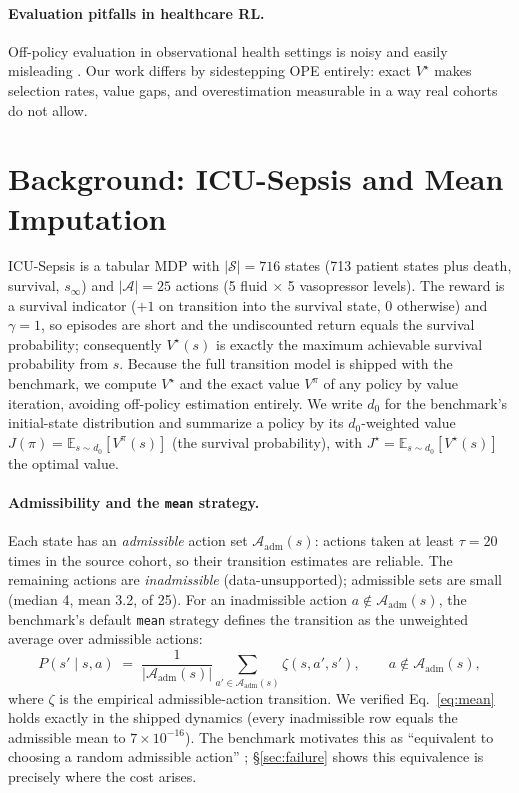 \documentclass{article}
\newcommand{\Adm}{\mathcal{A}_{\mathrm{adm}}}
\begin{document}
\paragraph{Evaluation pitfalls in healthcare RL.}
Off-policy evaluation in observational health settings is noisy and easily
misleading \citep{gottesman2019guidelines,gottesman2018evaluating}. Our work
differs by sidestepping OPE entirely: exact $V^\star$ makes selection rates,
value gaps, and overestimation measurable in a way real cohorts do not allow.

\section{Background: ICU-Sepsis and Mean Imputation}
\label{sec:background}
ICU-Sepsis \citep{choudhary2024icusepsis} is a tabular MDP with $|\mathcal{S}|{=}716$
states (713 patient states plus death, survival, $s_\infty$) and $|\mathcal{A}|{=}25$
actions (5 fluid $\times$ 5 vasopressor levels). The reward is a survival indicator
(${+}1$ on transition into the survival state, $0$ otherwise) and $\gamma{=}1$, so
episodes are short and the undiscounted return equals the survival probability;
consequently $V^\star(s)$ is exactly the maximum achievable survival probability
from $s$. Because the full transition model is shipped with the benchmark, we
compute $V^\star$ and the exact value $V^\pi$ of any policy by value iteration,
avoiding off-policy estimation entirely. We write $d_0$ for the benchmark's
initial-state distribution and summarize a policy by its $d_0$-weighted value
$J(\pi)=\mathbb{E}_{s\sim d_0}[V^\pi(s)]$ (the survival probability), with
$J^\star=\mathbb{E}_{s\sim d_0}[V^\star(s)]$ the optimal value.

\paragraph{Admissibility and the \texttt{mean} strategy.}
Each state has an \emph{admissible} action set $\Adm(s)$: actions taken at least
$\tau{=}20$ times in the source cohort, so their transition estimates are reliable.
The remaining actions are \emph{inadmissible} (data-unsupported); admissible sets
are small (median 4, mean 3.2, of 25). For an inadmissible action $a\notin\Adm(s)$,
the benchmark's default \texttt{mean} strategy defines the transition as the
unweighted average over admissible actions:
\begin{equation}
\label{eq:mean}
P(s'\mid s,a) \;=\; \frac{1}{|\Adm(s)|}\sum_{a'\in\Adm(s)} \zeta(s,a',s'),
\qquad a\notin\Adm(s),
\end{equation}
where $\zeta$ is the empirical admissible-action transition. We verified
Eq.~\eqref{eq:mean} holds exactly in the shipped dynamics (every inadmissible row
equals the admissible mean to $7\times10^{-16}$). The benchmark motivates this as
``equivalent to choosing a random admissible action'' \citep{choudhary2024icusepsis};
\S\ref{sec:failure} shows this equivalence is precisely where the cost arises.
\end{document}
